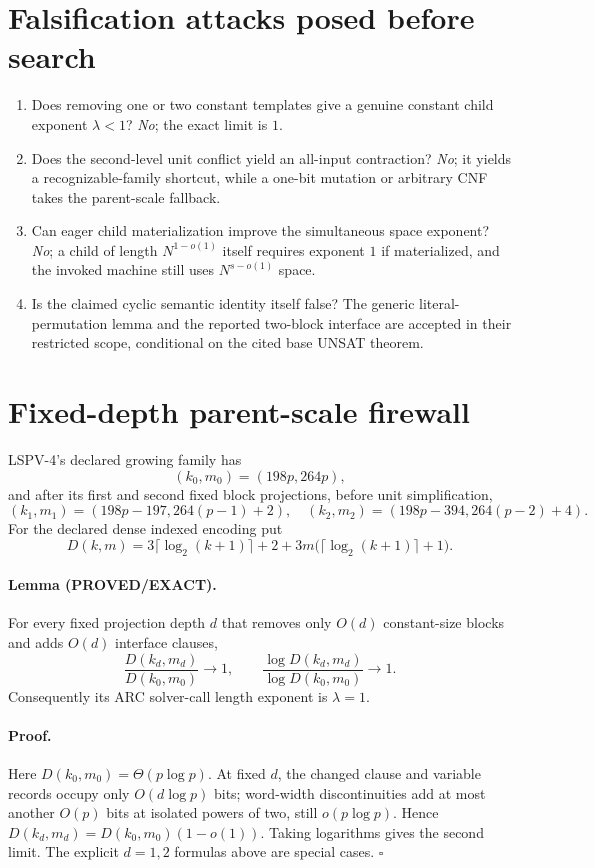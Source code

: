 \documentclass[11pt]{article}
\newcommand{\EXACT}{\textbf{PROVED/EXACT}}
\begin{document}
\section*{Falsification attacks posed before search}
\begin{enumerate}
\item Does removing one or two constant templates give a genuine constant
  child exponent $\lambda<1$?  \emph{No}; the exact limit is $1$.
\item Does the second-level unit conflict yield an all-input contraction?
  \emph{No}; it yields a recognizable-family shortcut, while a one-bit mutation
  or arbitrary CNF takes the parent-scale fallback.
\item Can eager child materialization improve the simultaneous space exponent?
  \emph{No}; a child of length $N^{1-o(1)}$ itself requires exponent $1$ if
  materialized, and the invoked machine still uses $N^{s-o(1)}$ space.
\item Is the claimed cyclic semantic identity itself false?  The generic
  literal-permutation lemma and the reported two-block interface are accepted
  in their restricted scope, conditional on the cited base UNSAT theorem.
\end{enumerate}

\section*{Fixed-depth parent-scale firewall}
LSPV-4's declared growing family has
\[
 (k_0,m_0)=(198p,264p),
\]
and after its first and second fixed block projections, before unit
simplification,
\[
 (k_1,m_1)=(198p-197,264(p-1)+2),
\quad
 (k_2,m_2)=(198p-394,264(p-2)+4).
\]
For the declared dense indexed encoding put
\[
 D(k,m)=3\lceil\log_2(k+1)\rceil+2
       +3m\bigl(\lceil\log_2(k+1)\rceil+1\bigr).
\]

\paragraph{Lemma (\EXACT).}
For every fixed projection depth $d$ that removes only $O(d)$ constant-size
blocks and adds $O(d)$ interface clauses,
\[
 \frac{D(k_d,m_d)}{D(k_0,m_0)}\longrightarrow 1,
 \qquad
 \frac{\log D(k_d,m_d)}{\log D(k_0,m_0)}\longrightarrow 1.
\]
Consequently its ARC solver-call length exponent is $\lambda=1$.

\paragraph{Proof.}
Here $D(k_0,m_0)=\Theta(p\log p)$.  At fixed $d$, the changed clause and
variable records occupy only $O(d\log p)$ bits; word-width discontinuities add
at most another $O(p)$ bits at isolated powers of two, still
$o(p\log p)$.  Hence $D(k_d,m_d)=D(k_0,m_0)(1-o(1))$.  Taking logarithms gives
the second limit.  The explicit $d=1,2$ formulas above are special cases.
\hfill$\square$
\end{document}
